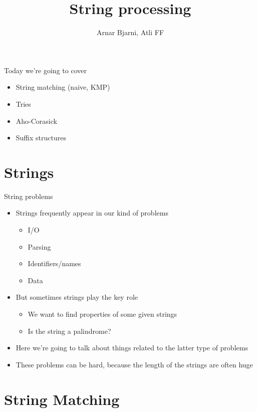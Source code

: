 \documentclass{beamer}
\title{String processing}
\author{Arnar Bjarni, Atli FF}
\institute{\href{http://ru.is/td}{School of Computer Science} \\[2pt] \href{http://ru.is}{Reykjavík University}}
\begin{document}
	\maketitle
	
	\begin{frame}[plain]{Today we're going to cover}
		\begin{itemize}
			\item String matching (naive, KMP)
			\item Tries
			\item Aho-Corasick
			\item Suffix structures
		\end{itemize}
	\end{frame}
	
	\section*{Strings}
	
	\begin{frame}[plain]{String problems}
		\begin{itemize}
			\item Strings frequently appear in our kind of problems
			\begin{itemize}
				\item I/O
				\item Parsing
				\item Identifiers/names
				\item Data
			\end{itemize}
			\vspace{5pt}
			\item But sometimes strings play the key role
			\begin{itemize}
				\item We want to find properties of some given strings
				\item Is the string a palindrome?
			\end{itemize}
			\vspace{5pt}
			\item Here we're going to talk about things related to the latter type of problems
			\vspace{5pt}
			\item These problems can be hard, because the length of the strings are often huge
		\end{itemize}
	\end{frame}
	
	\section*{String Matching}
	
\end{document}
